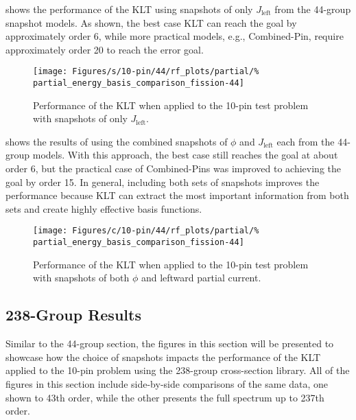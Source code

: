  shows the performance of the KLT using 
snapshots of only $J_{\text{left}}$ from the 44-group snapshot 
models. As shown, the best case KLT can reach the goal by approximately 
order 6, while more practical models, e.g., Combined-Pin, require approximately 
order 20 to 
reach the error goal.

\begin{figure*}[tb]
    \centering
    \texttt{[image: Figures/s/10-pin/44/rf\_plots/partial/\%
        partial\_energy\_basis\_comparison\_fission-44]}
    \caption{Performance of the KLT when applied to the 10-pin test problem 
        with snapshots of only $J_{\text{left}}$.}
    \label{fig:10-pin-partial-only}
\end{figure*}

 shows the results of using the combined 
snapshots of $\phi$ and $J_{\text{left}}$ each from the 
44-group models.  With this approach, the best case still reaches the goal at 
about order 6, but the practical case of Combined-Pins was improved to 
achieving the goal 
by 
order 15.  In general, including both sets of snapshots improves the 
performance 
because KLT can extract the most important information from both sets and 
create highly effective basis functions.

\begin{figure*}[tb]
    \centering
    \texttt{[image: Figures/c/10-pin/44/rf\_plots/partial/\%
        partial\_energy\_basis\_comparison\_fission-44]}
    \caption{Performance of the KLT when applied to the 10-pin test problem 
        with snapshots of both $\phi$ and leftward partial current.}
    \label{fig:10-pin-combined}
\end{figure*}

\subsection{238-Group Results}

Similar to the 44-group section, the figures in this section will be presented 
to showcase how the choice of snapshots impacts the performance of the KLT 
applied 
to the 10-pin problem using the 238-group cross-section library. All of the 
figures in 
this section include side-by-side comparisons of the same data, one 
shown to 43th order, while the other presents the full spectrum up to 
237th order.  

